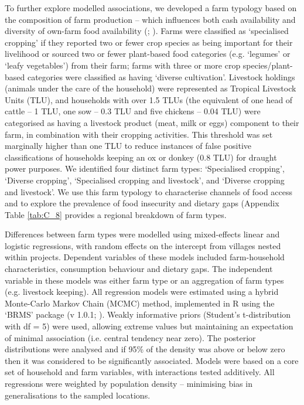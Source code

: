 To further explore modelled associations, we developed a farm typology based on the composition of farm production -- which influences both cash availability and diversity of own-farm food availability (\citealp{Headey2018}; \citealp{Jones2016}). Farms were classified as `specialised cropping' if they reported two or fewer crop species as being important for their livelihood or sourced two or fewer plant-based food categories (e.g. `legumes' or `leafy vegetables') from their farm; farms with three or more crop species/plant-based categories were classified as having `diverse cultivation'. Livestock holdings (animals under the care of the household) were represented as Tropical Livestock Units (TLU), and households with over 1.5 TLUs (the equivalent of one head of cattle -- 1 TLU, one sow -- 0.3 TLU and five chickens -- 0.04 TLU) were categorised as having a livestock product (meat, milk or eggs) component to their farm, in combination with their cropping activities. This threshold was set marginally higher than one TLU to reduce instances of false positive classifications of households keeping an ox or donkey (0.8 TLU) for draught power purposes. We identified four distinct farm types: `Specialised cropping', `Diverse cropping', `Specialised cropping and livestock', and `Diverse cropping and livestock'. We use this farm typology to characterise channels of food access and to explore the prevalence of food insecurity and dietary gaps (Appendix Table \ref{tab:C_8} provides a regional breakdown of farm types.

Differences between farm types were modelled using mixed-effects linear and logistic regressions, with random effects on the intercept from villages nested within projects. Dependent variables of these models included farm-household characteristics, consumption behaviour and dietary gaps. The independent variable in these models was either farm type or an aggregation of farm types (e.g. livestock keeping). All regression models were estimated using a hybrid Monte-Carlo Markov Chain (MCMC) method, implemented in R using the `BRMS' package (v 1.0.1; \citealp{BuerknerP2016}). Weakly informative priors (Student's t-distribution with df = 5) were used, allowing extreme values but maintaining an expectation of minimal association (i.e. central tendency near zero). The posterior distributions were analysed and if 95\% of the density was above or below zero then it was considered to be significantly associated. Models were based on a core set of household and farm variables, with interactions tested additively. All regressions were weighted by population density -- minimising bias in generalisations to the sampled locations.


